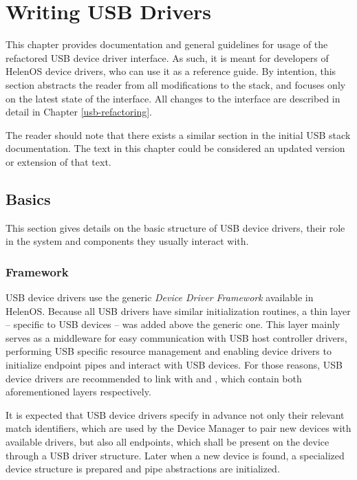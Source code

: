 \chapter{Writing USB Drivers}
\label{chap:usb-drivers}

This chapter provides documentation and general guidelines for usage of the
refactored USB device driver interface. As such, it is meant for developers of
HelenOS device drivers, who can use it as a reference guide. By intention, this
section abstracts the reader from all modifications to the stack, and focuses
only on the latest state of the interface. All changes to the interface are
described in detail in Chapter \ref{usb-refactoring}.

The reader should note that there exists a similar section in the initial USB
stack documentation. The text in this chapter could be considered an updated
version or extension of that text.


\section{Basics}

This section gives details on the basic structure of USB device drivers, their
role in the system and components they usually interact with.


\subsection{Framework}

USB device drivers use the generic \textit{Device Driver Framework} available in
HelenOS. Because all USB drivers have similar initialization routines, a thin
layer -- specific to USB devices -- was added above the generic one. This layer
mainly serves as a middleware for easy communication with USB host controller
drivers, performing USB specific resource management and enabling device drivers
to initialize endpoint pipes and interact with USB devices. For those reasons,
USB device drivers are recommended to link with  and
, which contain both aforementioned layers respectively.

It is expected that USB device drivers specify in advance not only their
relevant match identifiers, which are used by the Device Manager to pair new
devices with available drivers, but also all endpoints, which shall be present
on the device through a USB driver structure. Later when a new device is found,
a specialized device structure is prepared and pipe abstractions are
initialized.

